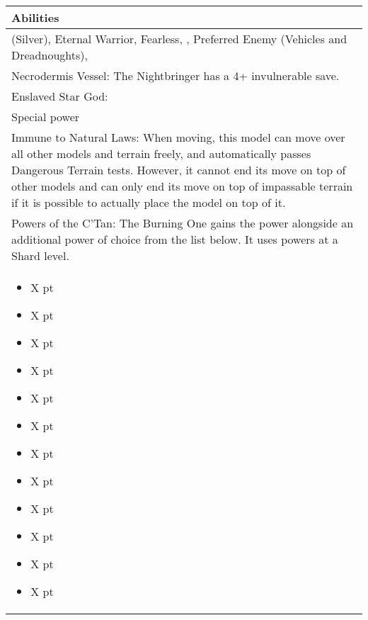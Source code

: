 \noindent
\begin{tabular}{||m{532pt}||}
	\hline
	Abilities \\
	\hline
	\quickref{Awakening Protocols} (Silver), Eternal Warrior, Fearless, \quickref{Living Metal}, Preferred Enemy (Vehicles and Dreadnoughts), \quickref{Reanimation Protocols} \\
	Necrodermis Vessel: The Nightbringer has a 4+ invulnerable save. \\
	Enslaved Star God:  \\
	Special power \\
	Immune to Natural Laws: When moving, this model can move over all other models and terrain 	freely, and automatically passes Dangerous Terrain tests. However, it 	cannot end its move on top of other models and can only end its move on top of impassable terrain if it is possible to actually place the model on top of it. \\
	Powers of the C'Tan: The Burning One gains the \quickref{Lord of Fire} power alongside an additional power of choice from the list below. It uses powers at a Shard level. \\
	\begin{itemize}
		\item \quickref{Antimatter Meteor} \hrulefill X pt
		\item \quickref{Cosmic Fire} \hrulefill X pt
		\item \quickref{Entropic Touch} \hrulefill X pt
		\item \quickref{Moulder of Worlds} \hrulefill X pt
		\item \quickref{Pyreshards} \hrulefill X pt
		\item \quickref{Sentient Singularity} \hrulefill X pt
		\item \quickref{Seismic Assault} \hrulefill X pt
		\item \quickref{Sky of Falling Stars} \hrulefill X pt
		\item \quickref{Swarm of Spirit Dust} \hrulefill X pt
		\item \quickref{Time's Arrow} \hrulefill X pt
		\item \quickref{Transdimensional Thunderbolt} \hrulefill X pt
		\item \quickref{Withering Worldscape} \hrulefill X pt
	\end{itemize} \\
	\hline
\end{tabular}


